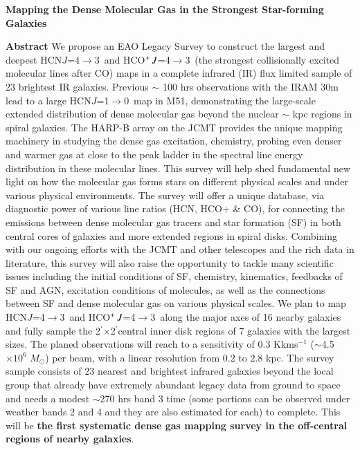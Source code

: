 \documentclass[legal,11pt]{article}
\def\kms    {\ifmmode{{\rm \ts km\ts s}^{-1}}\else{\ts km\ts s$^{-1}$}\fi}
\def\kms    {km\,s$^{-1}$\,}
\def\arcmin {\hbox{$^{\prime}$}}
\def\Kkms{K\,\kms }
\def\,{\thinspace}
\def\Msun{$M_\odot$}
\def\HCNoz      {HCN\,$J$=1$\rightarrow$0}
\def\HCNft        {HCN\,$J$=4$\rightarrow$3}
\def\HCOPft     {HCO$^+\,J$=4$\rightarrow$3}
\begin{document}
\begin{center}
        {\large\bf Mapping the Dense Molecular Gas in the Strongest Star-forming Galaxies}


\vspace { 0.5 cm}
 {\Large\bf Abstract} 
\justify
{{We propose an EAO Legacy Survey to construct the largest and deepest \HCNft\
and \HCOPft\ (the strongest collisionally excited molecular lines after CO) maps in a complete 
infrared (IR) flux limited sample of 23 brightest IR galaxies. Previous $\sim$ 100 hrs observations
with the IRAM 30m lead to a large \HCNoz\ map in M51, demonstrating the large-scale
extended distribution of dense molecular gas beyond the nuclear $\sim$ kpc regions
in spiral galaxies. The HARP-B array on the JCMT provides the unique mapping
machinery in studying the dense gas excitation, chemistry, probing even denser and
warmer gas at close to the peak ladder in the spectral line energy distribution in these 
molecular lines.  This survey will help shed
fundamental new light on how the molecular gas forms stars on different
physical scales and under various physical environments.  The survey will offer
a unique database, via diagnostic power of various line ratios (HCN, HCO+ \& CO),  
for connecting the emissions between dense molecular gas
tracers and star formation (SF) in both central cores of galaxies and more
extended regions in spiral disks.  Combining with our ongoing efforts with the
JCMT and other telescopes and the rich data in literature, this survey will
also raise the opportunity to tackle many scientific issues including the
initial conditions of SF, chemistry, kinematics, feedbacks of SF and AGN,
excitation conditions of molecules, as well as the connections between SF and
dense molecular gas on various physical scales. We plan to map \HCNft\ and
\HCOPft\ along the major axes of 16 nearby galaxies and fully sample the
2\arcmin$\times$2\arcmin central inner disk regions of 7 galaxies with the
largest sizes. The planed observations will reach to a sensitivity of 0.3 \Kkms
($\sim$4.5$\times10^6$ \Msun) per beam, with a linear resolution from 0.2 to 2.8 kpc.
The survey sample consists of 23 nearest and brightest infrared galaxies beyond the
local group that already have  extremely abundant legacy data from ground to space 
and needs a modest $\sim$270 hrs band 3 time (some portions can be
observed under weather bands 2 and 4 and they are also estimated for each) to complete. 
This will be {\bf the first systematic dense gas mapping survey in
the off-central regions of nearby galaxies}. }}

\end{center}
\end{document}
